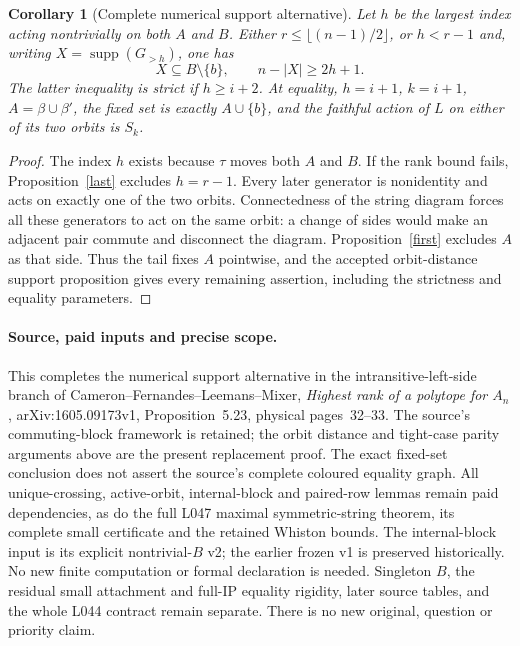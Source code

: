 \documentclass[11pt,a4paper]{article}
\newtheorem{corollary}[lemma]{Corollary}
\begin{document}
\begin{corollary}[Complete numerical support alternative]
Let $h$ be the largest index acting nontrivially on both $A$
and $B$. Either $r\leq\lfloor(n-1)/2\rfloor$, or $h<r-1$
and, writing $X=\operatorname{supp}(G_{>h})$, one has
\[
 X\subseteq B\setminus\{b\},\qquad
 n-|X|\geq2h+1.
\]
The latter inequality is strict if $h\geq i+2$. At equality,
$h=i+1$, $k=i+1$, $A=\beta\cup\beta'$, the fixed set is
exactly $A\cup\{b\}$, and the faithful action of $L$ on
either of its two orbits is $S_k$.
\end{corollary}
\begin{proof}
The index $h$ exists because $\tau$ moves both $A$ and $B$.
If the rank bound fails, Proposition~\ref{last} excludes
$h=r-1$. Every later generator is nonidentity and acts on
exactly one of the two orbits. Connectedness of the string
diagram forces all these generators to act on the same
orbit: a change of sides would make an adjacent pair commute
and disconnect the diagram. Proposition~\ref{first} excludes
$A$ as that side. Thus the tail fixes $A$ pointwise, and the
accepted orbit-distance support proposition gives every
remaining assertion, including the strictness and equality
parameters.
\end{proof}

\paragraph{Source, paid inputs and precise scope.}
This completes the numerical support alternative in the
intransitive-left-side branch of Cameron--Fernandes--Leemans--Mixer,
\emph{Highest rank of a polytope for $A_n$},
arXiv:1605.09173v1, Proposition~5.23, physical pages~32--33.
The source's commuting-block framework is retained; the orbit
distance and tight-case parity arguments above are the present
replacement proof. The exact fixed-set conclusion does not
assert the source's complete coloured equality graph.
All unique-crossing, active-orbit, internal-block and paired-row
lemmas remain paid dependencies, as do the full L047 maximal
symmetric-string theorem, its complete small certificate and
the retained Whiston bounds. The internal-block input is its
explicit nontrivial-$B$ v2; the earlier frozen v1 is preserved
historically. No new finite computation or formal declaration
is needed. Singleton $B$, the residual small attachment and
full-IP equality rigidity, later source tables, and the whole
L044 contract remain separate. There is no new original,
question or priority claim.
\end{document}
